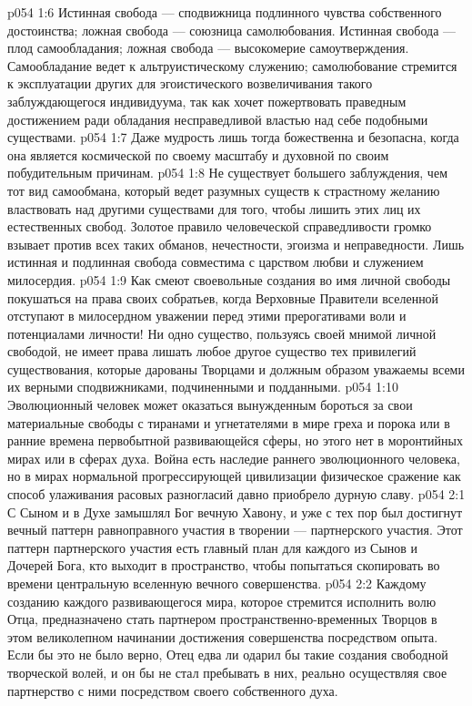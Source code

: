 \vs p054 1:6 Истинная свобода --- сподвижница подлинного чувства собственного достоинства; ложная свобода --- союзница самолюбования. Истинная свобода --- плод самообладания; ложная свобода --- высокомерие самоутверждения. Самообладание ведет к альтруистическому служению; самолюбование стремится к эксплуатации других для эгоистического возвеличивания такого заблуждающегося индивидуума, так как хочет пожертвовать праведным достижением ради обладания несправедливой властью над себе подобными существами.
\vs p054 1:7 \pc Даже мудрость лишь тогда божественна и безопасна, когда она является космической по своему масштабу и духовной по своим побудительным причинам.
\vs p054 1:8 \pc Не существует большего заблуждения, чем тот вид самообмана, который ведет разумных существ к страстному желанию властвовать над другими существами для того, чтобы лишить этих лиц их естественных свобод. Золотое правило человеческой справедливости громко взывает против всех таких обманов, нечестности, эгоизма и неправедности. Лишь истинная и подлинная свобода совместима с царством любви и служением милосердия.
\vs p054 1:9 Как смеют своевольные создания во имя личной свободы покушаться на права своих собратьев, когда Верховные Правители вселенной отступают в милосердном уважении перед этими прерогативами воли и потенциалами личности! Ни одно существо, пользуясь своей мнимой личной свободой, не имеет права лишать любое другое существо тех привилегий существования, которые дарованы Творцами и должным образом уважаемы всеми их верными сподвижниками, подчиненными и подданными.
\vs p054 1:10 Эволюционный человек может оказаться вынужденным бороться за свои материальные свободы с тиранами и угнетателями в мире греха и порока или в ранние времена первобытной развивающейся сферы, но этого нет в моронтийных мирах или в сферах духа. Война есть наследие раннего эволюционного человека, но в мирах нормальной прогрессирующей цивилизации физическое сражение как способ улаживания расовых разногласий давно приобрело дурную славу.
\vs p054 2:1 С Сыном и в Духе замышлял Бог вечную Хавону, и уже с тех пор был достигнут вечный паттерн равноправного участия в творении --- партнерского участия. Этот паттерн партнерского участия есть главный план для каждого из Сынов и Дочерей Бога, кто выходит в пространство, чтобы попытаться скопировать во времени центральную вселенную вечного совершенства.
\vs p054 2:2 Каждому созданию каждого развивающегося мира, которое стремится исполнить волю Отца, предназначено стать партнером пространственно\hyp{}временных Творцов в этом великолепном начинании достижения совершенства посредством опыта. Если бы это не было верно, Отец едва ли одарил бы такие создания свободной творческой волей, и он бы не стал пребывать в них, реально осуществляя свое партнерство с ними посредством своего собственного духа.
